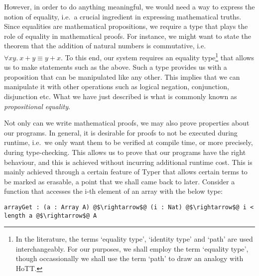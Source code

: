 \documentclass[12pt,twoside,maitrise]{dms}
\theoremstyle{definition}
\numberwithin{equation}{section}
\numberwithin{table}{chapter}
\numberwithin{figure}{chapter}
\begin{document}
However, in order to do anything meaningful, we would need a way to express the
notion of equality, i.e.\ a crucial ingredient in expressing mathematical
truths. Since equalities are mathematical propositions, we require a type that
plays the role of equality in mathematical proofs. For instance, we might want
to state the theorem that the addition of natural numbers is commutative, i.e.
$\forall xy. \ x + y \equiv y + x$. To this end, our system requires an equality
type\footnote{In the literature, the terms `equality type', `identity type' and
`path' are used interchangeably. For our purposes, we shall employ the term
`equality type', though occassionally we shall use the term `path' to draw an
analogy with HoTT.} that allows us to make statements such as the above. Such a
type provides us with a proposition that can be manipulated like any other. This
implies that we can manipulate it with other operations such as logical
negation, conjunction, disjunction etc. What we have just described is what is
commonly known as \emph{propositional equality}.


Not only can we write mathematical proofs, we may also prove properties about
our programs. In general, it is desirable for proofs to not be executed during
runtime, i.e.\ we only want them to be verified at compile time, or more
precisely, during type-checking. This allows us to prove that our programs have
the right behaviour, and this is achieved without incurring additional runtime
cost. This is mainly achieved through a certain feature of Typer that allows
certain terms to be marked as erasable, a point that we shall came back to
later. Consider a function that accesses the i-th element of an array with the
below type:

\begin{verbatim}
arrayGet : (a : Array A) @$\rightarrow$@ (i : Nat) @$\rightarrow$@ i < length a @$\rightarrow$@ A
\end{verbatim}
\end{document}
